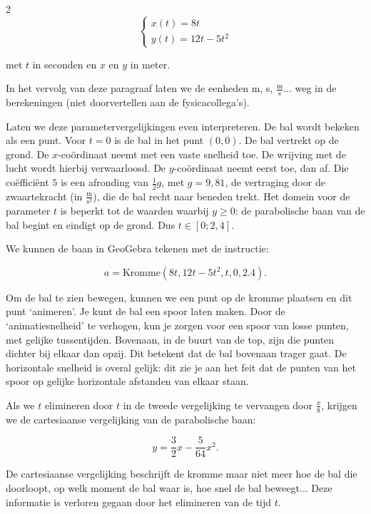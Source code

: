 \begin{multicols}{2}
$$\left\{ 
    \begin{array}{l}
         x(t) = 8t\\
         y(t) = 12t-5 t^2
    \end{array}
    \right.$$

met $t$ in seconden en $x$ en $y$ in meter.

In het vervolg van deze paragraaf laten we de eenheden m, s, $\frac{\mathrm{m}}{\mathrm{s}}$... weg in de berekeningen (niet doorvertellen aan de fysicacollega's).

Laten we deze parametervergelijkingen even interpreteren. De bal wordt bekeken als een punt. Voor $t=0$ is de bal in het punt $(0, 0)$. De bal vertrekt op de grond. De $x$-coördinaat neemt met een vaste snelheid toe. De wrijving met de lucht wordt hierbij verwaarloosd. De $y$-coördinaat neemt eerst toe, dan af. Die coëfficiënt $5$ is een afronding van $\frac{1}{2}g$, met $g=9,81$, de vertraging door de zwaartekracht (in $\frac{\mathrm{m}}{\mathrm{s^2}}$), die de bal recht naar beneden trekt. Het domein voor de parameter $t$ is beperkt tot de waarden waarbij $y\ge0$:  de parabolische baan van de bal begint en eindigt op de grond. Dus $t\in [0; 2,4]$. 

We kunnen de baan in GeoGebra tekenen met de instructie:

$$a=\text{Kromme}(8t,12t-5t^2,t,0,2.4).$$

Om de bal te zien bewegen, kunnen we een punt op de kromme plaatsen en dit punt `animeren'. Je kunt de bal een spoor laten maken. Door de `animatiesnelheid' te verhogen, kun je zorgen voor een spoor van losse punten, met gelijke tussentijden. Bovenaan, in de buurt van de top, zijn die punten dichter bij elkaar dan opzij. Dit betekent dat de bal bovenaan trager gaat. De horizontale snelheid is overal gelijk: dit zie je aan het feit dat de punten van het spoor op gelijke horizontale afstanden van elkaar staan.


Als we $t$ elimineren door $t$ in de tweede vergelijking te vervangen door $\frac{x}{8}$, krijgen we de cartesiaanse vergelijking van de parabolische baan:

$$y=\frac{3}{2}x-\frac{5}{64}x^2.$$ 

De cartesiaanse vergelijking beschrijft de kromme maar niet meer hoe de bal die doorloopt, op welk moment de bal waar is, hoe snel de bal beweegt... Deze informatie is verloren gegaan door het elimineren van de tijd $t$.


\end{multicols}

